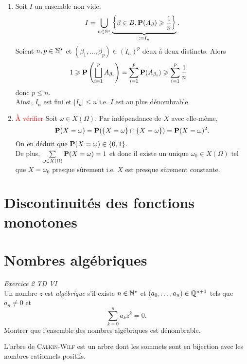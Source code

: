 \begin{solution}
\begin{enumerate}
    \item Soit $I$ un ensemble non vide. 
    $$I = \bigcup_{n \in \Ne} \underbrace{\left \{ \beta \in B, \P(A_\beta) \geqslant \frac{1}{n} \right \}}_{\defeq I_n}.$$
    Soient $n, p \in \Ne$ et $(\beta_1, \dots, \beta_p) \in (I_n)^p$ deux à deux distincts. Alors
    \begin{align*}
        1 \geqslant \P \left( \bigsqcup_{i=1}^p A_{\beta_i} \right) &= \sum_{i=1}^p \P(A_{\beta_i}) \geqslant \sum_{i=1}^p \frac{1}{n}
    \end{align*}
    donc $p \leqslant n$. \\
    Ainsi, $I_n$ est fini et $|I_n| \leqslant n$ i.e. $I$ est au plus dénombrable. 
    \item \textcolor{red}{À vérifier} Soit $\omega \in X(\Omega)$. Par indépendance de $X$ avec elle-même,
    $$\P(X = \omega) = \P(\{X=\omega\} \cap \{X=\omega\})= \P(X=\omega)^2.$$
    On en déduit que $\P(X=\omega) \in \{ 0, 1 \}$. \\
    De plus, $\sum\limits_{\omega \in X(\Omega)} \P(X=\omega) = 1$ et donc il existe un unique $\omega_0 \in X(\Omega)$ tel que $X=\omega_0$ presque sûrement i.e. $X$ est presque sûrement constante. 
\end{enumerate}
\end{solution}

\section{Discontinuités des fonctions monotones}


\section{Nombres algébriques}
\begin{exercice}
\emph{Exercice 2 TD VI} \\
Un nombre $z$ est \emph{algébrique} s'il existe $n \in \Ne$ et $(a_0, \dots, a_n) \in \Q^{n+1}$ tels que $a_n \not=0$ et 
$$\sum_{k=0}^n a_k z^k = 0.$$
Montrer que l'ensemble des nombres algébriques est dénombrable. 
\end{exercice}


\begin{marginfigure}
    
    L'arbre de \textsc{Calkin}-\textsc{Wilf} est un arbre dont les sommets sont en bijection avec les nombres rationnels positifs.
\end{marginfigure}

